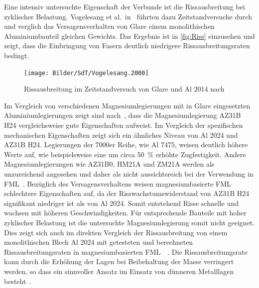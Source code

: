 Eine intensiv untersuchte Eigenschaft der Verbunde ist die Rissausbreitung bei zyklischer Belastung.
Vogelesang et al.\ in~\cite{Demaid1995} führten dazu Zeitstandversuche durch und verglich das Versagensverhalten von Glare einem monolithischen Aluminiumbauteil gleichen Gewichts.
Das Ergebnis ist in \autoref{fig:Riss} einzusehen und zeigt, dass die Einbringung von Fasern deutlich niedrigere Rissausbreitungsraten bedingt.


\begin{figure}[H]%
    \centering
    \texttt{[image: Bilder/SdT/Vogelesang.2000]}
    \caption[Zeitstandsversuch Glare vs. Al 2024]{Rissausbreitung im Zeitstandversuch von Glare und Al 2014 nach~\cite{Vogelesang2000}}
    \label{fig:Riss}
\end{figure}




Im Vergleich von verschiedenen Magnesiumlegierungen mit in Glare eingesetzten Aluminiumlegierungen zeigt sind nach~\cite{Alderliesten2008}, dass die Magnesiumlegierung AZ31B H24 vergleichsweise gute Eigenschaften aufweist.
Im Vergleich der spezifischen mechanischen Eigenschaften zeigt sich ein ähnliches Niveau von Al 2024 und AZ31B H24.
Legierungen der 7000er Reihe, wie Al 7475, weisen deutlich höhere Werte auf, wie beispielsweise eine um circa \SI{50}{\percent} erhöhte Zugfestigkeit.
Andere Magnesiumlegierungen wie AZ31B0, HM21A und ZM21A werden als unzureichend angesehen und daher als nicht aussichtsreich bei der Verwendung in FML~.
Bezüglich des Versagensverhaltens weisen magnesiumbasierte FML schlechtere Eigenschaften auf, da der Risswachstumswiderstand von AZ31B H24 signifikant niedriger ist als von Al 2024.
Somit entstehend Risse schnelle und wachsen mit höheren Geschwindigkeiten.
Für entsprechende Bauteile mit hoher zyklischer Belastung ist die untersuchte Magnesiumlegierung somit nicht geeignet.
Dies zeigt sich auch im direkten Vergleich der Rissausbreitung von einem monolithischen Blech Al 2024 mit getesteten und berechneten Rissausbreitungsraten in magnesiumbasierten FML~\cite{Alderliesten2008,Cortes2005}~.
Die Rissausbreitungsrate kann durch die Erhöhung der Lagen bei Beibehaltung der Masse verringert werden, so dass ein sinnvoller Ansatz im Einsatz von dünneren Metalllagen besteht~\cite{Alderliesten2008}.


